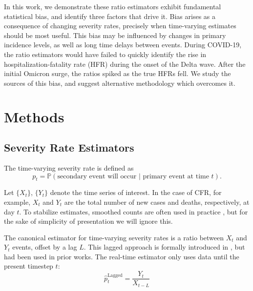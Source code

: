 \documentclass{article}
\begin{document}
In this work, we demonstrate these ratio estimators exhibit fundamental statistical bias, and identify three factors that drive it. Bias arises as a consequence of changing severity rates, precisely when time-varying estimates should be most useful. This bias may be influenced by changes in primary incidence levels, as well as long time delays between events. During COVID-19, the ratio estimators would have failed to quickly identify the rise in hospitalization-fatality rate (HFR) during the onset of the Delta wave. After the initial Omicron surge, the ratios spiked as the true HFRs fell. We study the sources of this bias, and suggest alternative methodology which overcomes it.


\section{Methods}
\subsection{Severity Rate Estimators}

The time-varying severity rate is defined as
\begin{equation}\label{eq:severity}
    p_t = \mathbb{P}(\text{secondary event will occur } \vert \text{ primary event at time }t).
\end{equation}

Let $\{X_t\}$, $\{Y_t\}$ denote the time series of interest. In the case of CFR, for example, $X_t$ and $Y_t$ are the total number of new cases and deaths, respectively, at day $t$. To stabilize estimates, smoothed counts are often used in practice \cite{germany,timevar_ifr,LIU2023100350}, but for the sake of simplicity of presentation we will ignore this. 

The canonical estimator for time-varying severity rates is a ratio between $X_t$ and $Y_t$ events, offset by a lag $L$. This lagged approach is formally introduced in \citeauthor{thomas2021estimating}, but had been used in prior works. The real-time estimator only uses data until the present timestep $t$: 
\begin{equation}\label{eq:lagged}
    \hat{p}_t^{\text{Lagged}} = \frac{Y_t}{X_{t-L}}
\end{equation}
\end{document}
